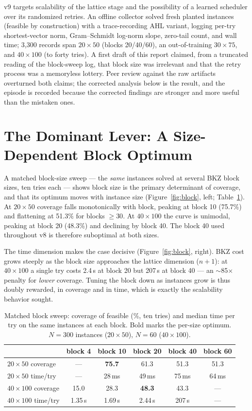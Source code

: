 \documentclass[12pt]{article}
\begin{document}
v9 targets scalability of the lattice stage and the possibility of a learned scheduler over its randomized retries. An offline collector solved fresh planted instances (feasible by construction) with a trace-recording AHL variant, logging per-try shortest-vector norm, Gram--Schmidt log-norm slope, zero-tail count, and wall time; 3{,}300 records span $20 \times 50$ (blocks 20/40/60), an out-of-training $30 \times 75$, and $40 \times 100$ (to forty tries). A first draft of this report claimed, from a truncated reading of the block-sweep log, that block size was irrelevant and that the retry process was a memoryless lottery. Peer review against the raw artifacts overturned both claims; the corrected analysis below is the result, and the episode is recorded because the corrected findings are stronger and more useful than the mistaken ones.

\section{The Dominant Lever: A Size-Dependent Block Optimum}

A matched block-size sweep --- the \emph{same} instances solved at several BKZ block sizes, ten tries each --- shows block size is the primary determinant of coverage, and that its optimum moves with instance size (Figure~\ref{fig:block}, left; Table~\ref{tab:block}). At $20 \times 50$ coverage falls monotonically with block, peaking at block 10 (75.7\%) and flattening at 51.3\% for blocks $\geq 30$. At $40 \times 100$ the curve is unimodal, peaking at block 20 (48.3\%) and declining by block 40. The block 40 used throughout v8 is therefore suboptimal at both sizes.

The time dimension makes the case decisive (Figure~\ref{fig:block}, right). BKZ cost grows steeply as the block size approaches the lattice dimension ($n+1$): at $40 \times 100$ a single try costs 2.4\,s at block 20 but 207\,s at block 40 --- an $\sim$85$\times$ penalty for \emph{lower} coverage. Tuning the block down as instances grow is thus doubly rewarded, in coverage and in time, which is exactly the scalability behavior sought.

\begin{table}[t]
\centering
\caption{Matched block sweep: coverage of feasible (\%, ten tries) and median time per try on the same instances at each block. Bold marks the per-size optimum. $N=300$ instances ($20\times50$), $N=60$ ($40\times100$).}
\label{tab:block}
\begin{tabular}{lccccc}
\toprule
& block 4 & block 10 & block 20 & block 40 & block 60 \\
\midrule
$20\times50$ coverage & --- & \textbf{75.7} & 61.3 & 51.3 & 51.3 \\
$20\times50$ time/try & --- & 28\,ms & 49\,ms & 75\,ms & 64\,ms \\
$40\times100$ coverage & 15.0 & 28.3 & \textbf{48.3} & 43.3 & --- \\
$40\times100$ time/try & 1.35\,s & 1.69\,s & 2.44\,s & 207\,s & --- \\
\bottomrule
\end{tabular}
\end{table}
\end{document}
